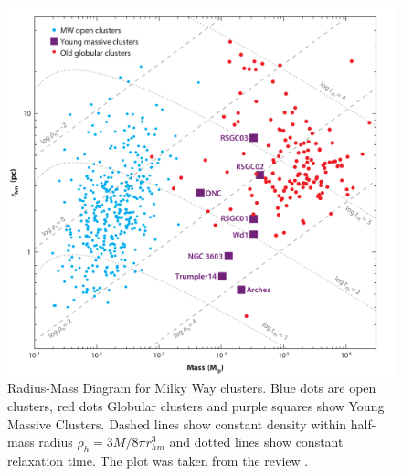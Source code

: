 \begin{figure}
\center
\includegraphics[width=0.65\linewidth]{Figures/0_MassRadiusClusters.png}
\caption{Radius-Mass Diagram for Milky Way clusters. Blue dots are open clusters, red dots Globular clusters and purple squares show Young Massive Clusters. Dashed lines show constant density within half-mass radius $\rho_h = 3M/8\pi r^3_{hm}$ and dotted lines show constant relaxation time. The plot was taken from the review \protect\cite{PortegiesZwart2010}.}
\label{Fig:0_SPZ}
\end{figure}

